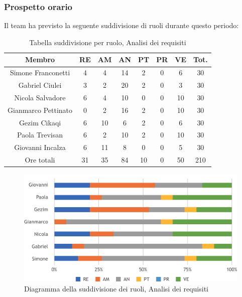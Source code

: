 \subsubsection{Prospetto orario}
Il team ha previsto la seguente suddivisione di ruoli durante questo periodo:\\
\begin{table}[h]
\caption{Tabella suddivisione per ruolo, Analisi dei requisiti}  
\begin{center}
\begin{tabular}{ |c|c|c|c|c|c|c|c|  }
 \hline
 Membro 		& RE 	& AM 	& AN 	& PT 	& PR 	& VE 	& Tot.\\
 \hline\hline
 Simone	Franconetti		& 4 		& 4 		& 14 	& 2 		& 0 		& 6 		& 30\\
 Gabriel Ciulei			& 3 		& 2 		& 20 	& 2 		& 0 		& 3 		& 30\\
 Nicola	Salvadore		& 6 		& 4 		& 10 	& 0 		& 0 		& 10 	& 30\\
 Gianmarco	Pettinato	& 0 		& 2 		& 16 	& 2 		& 0 		& 10 	& 30\\
 Gezim	Cikaqi			& 6 		& 10 	 	& 6 		& 2 		& 0 		& 6	 	& 30\\
 Paola	Trevisan		& 6 		& 2 		& 10 	& 2 		& 0 		& 10 	& 30\\
 Giovanni	Incalza		& 6 		& 11 		& 8 		& 0 		& 0 		& 5  	& 30\\
 \hline\hline
 Ore totali		& 31		& 35		& 84 	& 10 	& 0 		& 50 	& 210\\
  \hline
\end{tabular}
\end{center}
\end{table}
\begin{figure}[h!]
	\includegraphics[width=\textwidth]{res/img/hi17}
	\caption{Diagramma della suddivisione dei ruoli, Analisi dei requisiti}
\end{figure}

